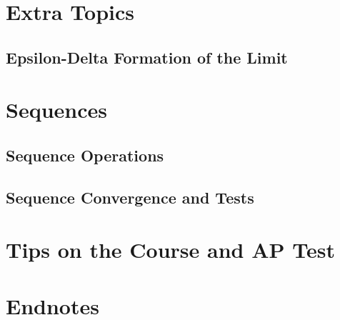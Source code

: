 \documentclass{article}
\begin{document}
\section{Extra Topics}
\subsection{Epsilon-Delta Formation of the Limit}\newpage
\section{Sequences}\newpage
\subsection{Sequence Operations}\newpage
\subsection{Sequence Convergence and Tests}
\section{Tips on the Course and AP Test}\newpage
\section{Endnotes}
\end{document}
